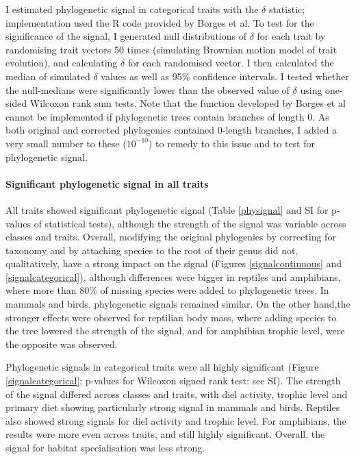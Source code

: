 I estimated phylogenetic signal in categorical traits with the $\delta$ statistic; implementation used the R code provided by Borges et al. To test for the significance of the signal, I generated null distributions of $\delta$  for each trait by randomising trait vectors 50 times (simulating Brownian motion model of trait evolution), and calculating $\delta$ for each randomised vector. I then calculated the median of simulated $\delta$ values as well as 95\% confidence intervals. I tested whether the null-medians were significantly lower than the observed value of $\delta$ using one-sided Wilcoxon rank sum tests. Note that the function developed by Borges et al cannot be implemented if phylogenetic trees contain branches of length 0. As both original and corrected phylogenies contained 0-length branches, I added a very small number to these ($10^{-10}$) to remedy to this issue and to test for phylogenetic signal. 

\paragraph{Significant phylogenetic signal in all traits}
All traits showed significant phylogenetic signal (Table \ref{physignal} and SI for p-values of statistical tests), although the strength of the signal was variable across classes and traits. Overall, modifying the original phylogenies by correcting for taxonomy and by attaching species to the root of their genus did not, qualitatively, have a strong impact on the signal (Figures \ref{signalcontinuous} and \ref{signalcategorical}), although differences were bigger in reptiles and amphibians, where more than 80\% of missing species were added to phylogenetic trees. In mammals and birds, phylogenetic signals remained similar. On the other hand,the stronger effects were observed for reptilian body mass, where adding species to the tree lowered the strength of the signal, and for amphibian trophic level, were the opposite was observed.

Phylogenetic signals in categorical traits were all highly significant (Figure \ref{signalcategorical}; p-values for Wilcoxon signed rank test: see SI). The strength of the signal differed across classes and traits, with diel activity, trophic level and primary diet showing particularly strong signal in mammals and birds. Reptiles also showed strong signals for diel activity and trophic level. For amphibians, the results were more even across traits, and still highly significant. Overall, the signal for habitat specialisation was less strong.


